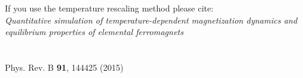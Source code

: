 \noindent If you use the temperature rescaling method please cite:\\

\noindent \textit{\small Quantitative simulation of temperature-dependent magnetization dynamics and equilibrium properties of elemental ferromagnets}\\
\vspace{-0.4cm}\\
\\
{\small Phys. Rev. B \textbf{91}, 144425 (2015)}

